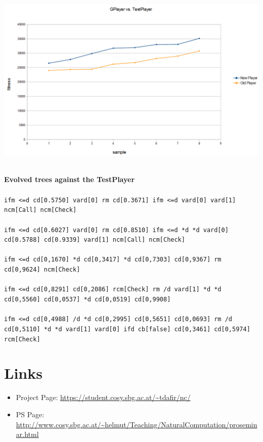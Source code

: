 \documentclass[12pt,fleqn,a4paper]{article}
\begin{document}
\begin{center}
	\includegraphics[width=.9\textwidth]{gp_vs_tp_1.png}
\end{center}
\\
\textbf{Evolved trees against the TestPlayer}\\ \\
\texttt{ifm <=d cd[0.5750] vard[0] rm cd[0.3671] ifm <=d vard[0] vard[1] ncm[Call] ncm[Check]} \\ \\
\texttt{ifm <=d cd[0.6027] vard[0] rm cd[0.8510] ifm <=d *d *d vard[0] cd[0.5788] cd[0.9339] vard[1] ncm[Call] ncm[Check]}\\ \\
\texttt{ifm <=d cd[0,1670] *d cd[0,3417] *d cd[0,7303] cd[0,9367] rm cd[0,9624] ncm[Check]}\\ \\
\texttt{ifm <=d cd[0,8291] cd[0,2086] rcm[Check] rm /d vard[1] *d *d cd[0,5560] cd[0,0537] *d cd[0,0519] cd[0,9908]}\\ \\
\texttt{ifm <=d cd[0,4988] /d *d cd[0,2995] cd[0,5651] cd[0,0693] rm /d cd[0,5110] *d *d vard[1] vard[0] ifd cb[false] cd[0,3461] cd[0,5974] rcm[Check]}

\newpage


\section{Links}

\begin{itemize}
\item Project Page: \url{https://student.cosy.sbg.ac.at/~tdafir/nc/}
\item PS Page:
\url{http://www.cosy.sbg.ac.at/~helmut/Teaching/NaturalComputation/proseminar.html}

\end{itemize}

\nocite{*}

\end{document}
